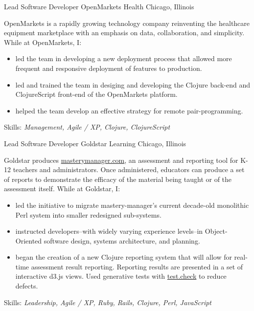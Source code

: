 \documentclass[11pt,letterpaper]{moderncv}
\begin{document}
 {Lead Software Developer}
  {OpenMarkets Health} {Chicago, Illinois} {} { %
  OpenMarkets is a rapidly growing technology company reinventing the
  healthcare equipment marketplace with an emphasis on data, collaboration,
  and simplicity.  While at OpenMarkets, I:
  \begin{itemize}
  \item led the team in developing a new deployment process that allowed more
    frequent and responsive deployment of features to production.
  \item led and trained the team in desiging and developing the Clojure
    back-end and ClojureScript front-end of the OpenMarkets platform.
  \item helped the team develop an effective strategy for remote
    pair-programming.
  \end{itemize}
  Skills: \emph{Management, Agile / XP, Clojure, ClojureScript}
}

 {Lead Software Developer} {Goldstar
  Learning} {Chicago, Illinois} {} { %
  Goldstar produces \href{https://www.masterymanager.com}{masterymanager.com},
  an assessment and reporting tool for K-12 teachers and administrators.  Once
  administered, educators can produce a set of reports to demonstrate the
  efficacy of the material being taught or of the assessment itself.  While at
  Goldstar, I:
  \begin{itemize}
  \item led the initiative to migrate mastery-manager's current decade-old
    monolithic Perl system into smaller redesigned sub-systems.
  \item instructed developers--with widely varying experience
    levels--in Object-Oriented software design, systems architecture,
    and planning.
  \item began the creation of a new Clojure reporting system that will allow
    for real-time assessment result reporting.  Reporting results are
    presented in a set of interactive d3.js views.  Used generative tests
    with \href{https://github.com/clojure/test.check}{test.check} to reduce
    defects.
  \end{itemize}
  Skills: \emph{Leadership, Agile / XP, Ruby, Rails, Clojure, Perl, JavaScript}
}
\end{document}
